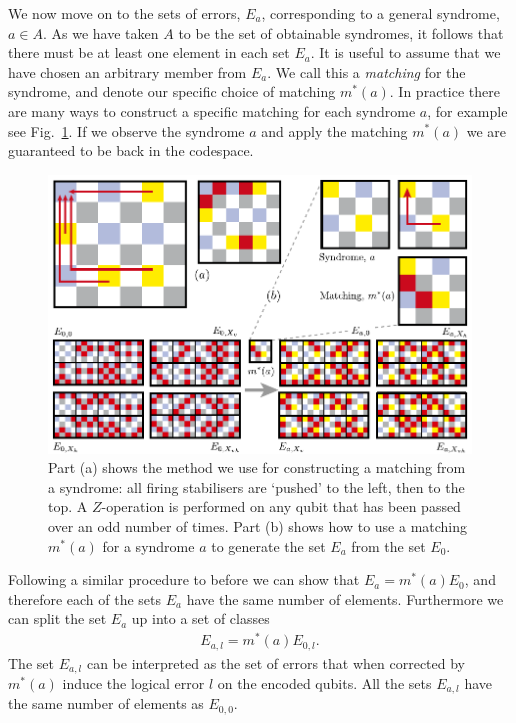 We now move on to the sets of errors, $E_a$, corresponding to a general syndrome, $a \in A$. As we have taken $A$ to be the set of obtainable syndromes, it follows that there must be at least one element in each set $E_a$. It is useful to assume that we have chosen an arbitrary member from $E_a$. We call this a \textit{matching} for the syndrome, and denote our specific choice of matching $m^*(a)$. In practice there are many ways to construct a specific matching for each syndrome $a$, for example see Fig.~\ref{matching}. If we observe the syndrome $a$ and apply the matching $m^*(a)$ we are guaranteed to be back in the codespace.

\begin{figure}[htb]
  \begin{center}
    \includegraphics{figures/e_a.pdf}
  \end{center}
  \caption{Part (a) shows the method we use for constructing a matching from a syndrome: all firing stabilisers are `pushed' to the left, then to the top. A $Z$-operation is performed on any qubit that has been passed over an odd number of times. Part (b) shows how to use a matching $m^*(a)$ for a syndrome $a$ to generate the set $E_a$ from the set $E_0$.}
  \label{matching}
\end{figure}

Following a similar procedure to before we can show that $E_a = m^*(a) E_0$, and therefore each of the sets $E_a$ have the same number of elements. Furthermore we can split the set $E_a$ up into a set of classes
\begin{align}
  E_{a,l} = m^*(a) E_{0, l}.
\end{align}
The set $E_{a,l}$ can be interpreted as the set of errors that when corrected by $m^*(a)$ induce the logical error $l$ on the encoded qubits. All the sets $E_{a, l}$ have the same number of elements as $E_{0,0}$.

